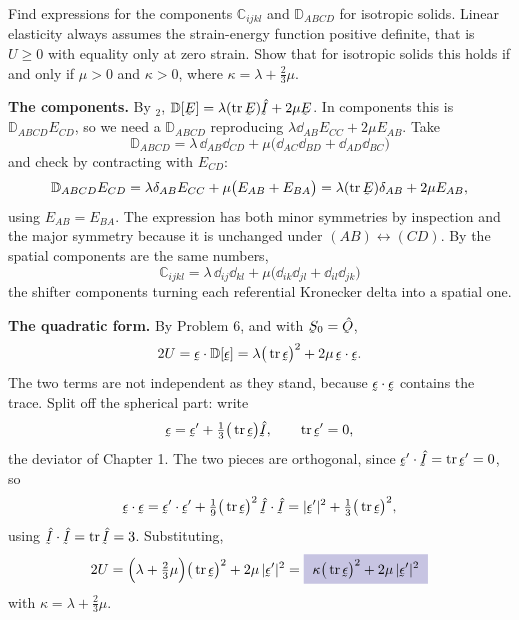 \begin{problem}
Find expressions for the components $\mathbb{C}_{ijkl}$ and
$\mathbb{D}_{ABCD}$ for isotropic solids. Linear elasticity always
assumes the strain-energy function positive definite, that is $U\ge0$
with equality only at zero strain. Show that for isotropic solids this
holds if and only if $\mu>0$ and $\kappa>0$, where
$\kappa=\lambda+\tfrac23\mu$.
\end{problem}

\begin{solution}
\textbf{The components.} By $_{2}$,
$\mathbb{D}[\bE]=\lambda(\tr\bE)\hI+2\mu\bE$. In components this is
$\mathbb{D}_{ABCD}E_{CD}$, so we need a $\mathbb{D}_{ABCD}$ reproducing
$\lambda\dd_{AB}E_{CC}+2\mu E_{AB}$. Take
\[
   \boxed{\;\mathbb{D}_{ABCD}=\lambda\,\dd_{AB}\dd_{CD}
   +\mu\big(\dd_{AC}\dd_{BD}+\dd_{AD}\dd_{BC}\big)\;}
\]
and check by contracting with $E_{CD}$:
\[
   \mathbb{D}_{ABCD}E_{CD}
   =\lambda\dd_{AB}E_{CC}+\mu\big(E_{AB}+E_{BA}\big)
   =\lambda(\tr\bE)\dd_{AB}+2\mu E_{AB},
\]
using $E_{AB}=E_{BA}$. The expression has both minor symmetries by
inspection and the major symmetry because it is unchanged under
$(AB)\leftrightarrow(CD)$. By  the spatial components are the
same numbers,
\[
   \boxed{\;\mathbb{C}_{ijkl}=\lambda\,\dd_{ij}\dd_{kl}
   +\mu\big(\dd_{ik}\dd_{jl}+\dd_{il}\dd_{jk}\big)\;}
\]
the shifter components turning each referential Kronecker delta into a
spatial one.

\textbf{The quadratic form.} By Problem 6, and with $\bS_{0}=\hOb$,
\[
   2U=\vek{\epsilon}\cdot\mathbb{D}[\vek{\epsilon}]
   =\lambda\big(\tr\vek{\epsilon}\big)^{2}
   +2\mu\,\vek{\epsilon}\cdot\vek{\epsilon}.
\]
The two terms are not independent as they stand, because
$\vek{\epsilon}\cdot\vek{\epsilon}$ contains the trace. Split off the
spherical part: write
\[
   \vek{\epsilon}=\vek{\epsilon}'+\tfrac13\big(\tr\vek{\epsilon}\big)\hI,
   \qquad \tr\vek{\epsilon}'=0 ,
\]
the deviator of Chapter 1. The two pieces are orthogonal, since
$\vek{\epsilon}'\cdot\hI=\tr\vek{\epsilon}'=0$, so
\[
   \vek{\epsilon}\cdot\vek{\epsilon}
   =\vek{\epsilon}'\cdot\vek{\epsilon}'
   +\tfrac19\big(\tr\vek{\epsilon}\big)^{2}\,\hI\cdot\hI
   =|\vek{\epsilon}'|^{2}+\tfrac13\big(\tr\vek{\epsilon}\big)^{2},
\]
using $\hI\cdot\hI=\tr\hI=3$. Substituting,
\[
   2U=\Big(\lambda+\tfrac23\mu\Big)\big(\tr\vek{\epsilon}\big)^{2}
   +2\mu\,|\vek{\epsilon}'|^{2}
   =\boxed{\;\kappa\big(\tr\vek{\epsilon}\big)^{2}
   +2\mu\,|\vek{\epsilon}'|^{2}\;}
\]
with $\kappa=\lambda+\tfrac23\mu$.


\end{solution}
